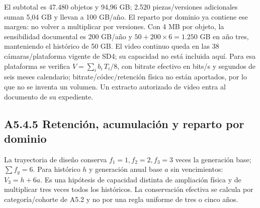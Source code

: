 El subtotal es 47.480 objetos y 94,96 GB; 2.520 piezas/versiones adicionales suman 5,04 GB y llevan a 100 GB/año. El reparto por dominio ya contiene ese margen: no volver a multiplicar por versiones. Con 4 MB por objeto, la sensibilidad documental es 200 GB/año y \(50+200\times6=1.250\) GB en año tres, manteniendo el histórico de 50 GB. El video continuo queda en las 38 cámaras/plataforma vigente de SD4; su capacidad no está incluida aquí. Para esa plataforma se verifica \(V=\sum_i b_i\,T_i/8\), con bitrate efectivo en bits/s y segundos de seis meses calendario; bitrate/códec/retención física no están aportados, por lo que no se inventa un volumen. Un extracto autorizado de video entra al documento de su expediente.

\subsection*{A5.4.5 Retención, acumulación y reparto por dominio}

La trayectoria de diseño conserva \(f_1=1,f_2=2,f_3=3\) veces la generación base; \(\sum f_y=6\). Para histórico \(h\) y generación anual base \(a\) sin vencimientos: \(V_3=h+6a\). Es una hipótesis de capacidad distinta de ampliación física y de multiplicar tres veces todos los históricos. La conservación efectiva se calcula por categoría/cohorte de A5.2 y no por una regla uniforme de tres o cinco años.


